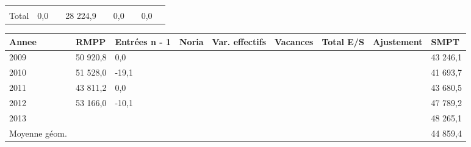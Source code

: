 \begin{longtable}[]{@{}lllllllll@{}}
\begin{minipage}[t]{0.06\columnwidth}
\strut
\end{minipage} & \begin{minipage}[t]{0.13\columnwidth}\raggedright
\strut
\end{minipage} & \begin{minipage}[t]{0.06\columnwidth}\raggedright
\strut
\end{minipage} & \begin{minipage}[t]{0.05\columnwidth}\raggedright
\strut
\end{minipage} & \begin{minipage}[t]{0.06\columnwidth}\raggedright
\strut
\end{minipage}\tabularnewline
\begin{minipage}[t]{0.05\columnwidth}\raggedright
Total\strut
\end{minipage} & \begin{minipage}[t]{0.10\columnwidth}\raggedright
0,0\strut
\end{minipage} & \begin{minipage}[t]{0.06\columnwidth}\raggedright
\strut
\end{minipage} & \begin{minipage}[t]{0.17\columnwidth}\raggedright
28 224,9\strut
\end{minipage} & \begin{minipage}[t]{0.06\columnwidth}\raggedright
\strut
\end{minipage} & \begin{minipage}[t]{0.13\columnwidth}\raggedright
0,0\strut
\end{minipage} & \begin{minipage}[t]{0.06\columnwidth}\raggedright
\strut
\end{minipage} & \begin{minipage}[t]{0.05\columnwidth}\raggedright
0,0\strut
\end{minipage} & \begin{minipage}[t]{0.06\columnwidth}\raggedright
\strut
\end{minipage}\tabularnewline
\bottomrule
\end{longtable}

\begin{longtable}[]{@{}lllllllll@{}}
\toprule
Annee & RMPP & Entrées n - 1 & Noria & Var. effectifs & Vacances & Total
E/S & Ajustement & SMPT\tabularnewline
\midrule
\endhead
2009 & 50 920,8 & 0,0 & & & & & & 43 246,1\tabularnewline
2010 & 51 528,0 & -19,1 & & & & & & 41 693,7\tabularnewline
2011 & 43 811,2 & 0,0 & & & & & & 43 680,5\tabularnewline
2012 & 53 166,0 & -10,1 & & & & & & 47 789,2\tabularnewline
2013 & & & & & & & & 48 265,1\tabularnewline
Moyenne géom. & & & & & & & & 44 859,4\tabularnewline
\bottomrule
\end{longtable}

